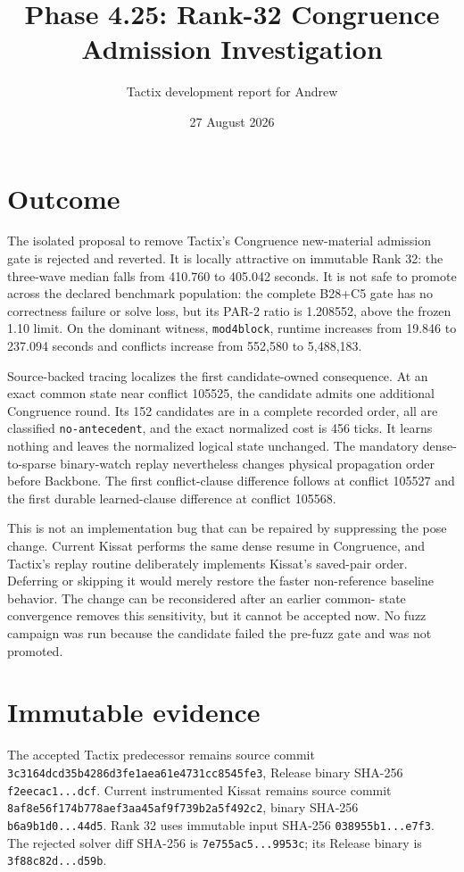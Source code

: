 \documentclass[11pt]{article}
\title{Phase 4.25: Rank-32 Congruence Admission Investigation}
\author{Tactix development report for Andrew}
\date{27 August 2026}
\newcommand{\code}[1]{\texttt{#1}}
\begin{document}
\maketitle

\section{Outcome}

The isolated proposal to remove Tactix's Congruence new-material admission
gate is rejected and reverted.  It is locally attractive on immutable Rank 32:
the three-wave median falls from 410.760 to 405.042 seconds.  It is not safe to
promote across the declared benchmark population: the complete B28+C5 gate has
no correctness failure or solve loss, but its PAR-2 ratio is 1.208552, above
the frozen 1.10 limit.  On the dominant witness, \code{mod4block}, runtime
increases from 19.846 to 237.094 seconds and conflicts increase from 552,580 to
5,488,183.

Source-backed tracing localizes the first candidate-owned consequence.  At an
exact common state near conflict 105525, the candidate admits one additional
Congruence round.  Its 152 candidates are in a complete recorded order, all
are classified \code{no-antecedent}, and the exact normalized cost is 456
ticks.  It learns nothing and leaves the normalized logical state unchanged.
The mandatory dense-to-sparse binary-watch replay nevertheless changes
physical propagation order before Backbone.  The first conflict-clause
difference follows at conflict 105527 and the first durable learned-clause
difference at conflict 105568.

This is not an implementation bug that can be repaired by suppressing the
pose change.  Current Kissat performs the same dense resume in Congruence, and
Tactix's replay routine deliberately implements Kissat's saved-pair order.
Deferring or skipping it would merely restore the faster non-reference
baseline behavior.  The change can be reconsidered after an earlier common-
state convergence removes this sensitivity, but it cannot be accepted now.
No fuzz campaign was run because the candidate failed the pre-fuzz gate and
was not promoted.

\section{Immutable evidence}

The accepted Tactix predecessor remains source commit
\code{3c3164dcd35b4286d3fe1aea61e4731cc8545fe3}, Release binary SHA-256
\code{f2eecac1...dcf}.  Current instrumented Kissat remains source commit
\code{8af8e56f174b778aef3aa45af9f739b2a5f492c2}, binary SHA-256
\code{b6a9b1d0...44d5}.  Rank 32 uses immutable input SHA-256
\code{038955b1...e7f3}.  The rejected solver diff SHA-256 is
\code{7e755ac5...9953c}; its Release binary is \code{3f88c82d...d59b}.
\end{document}

